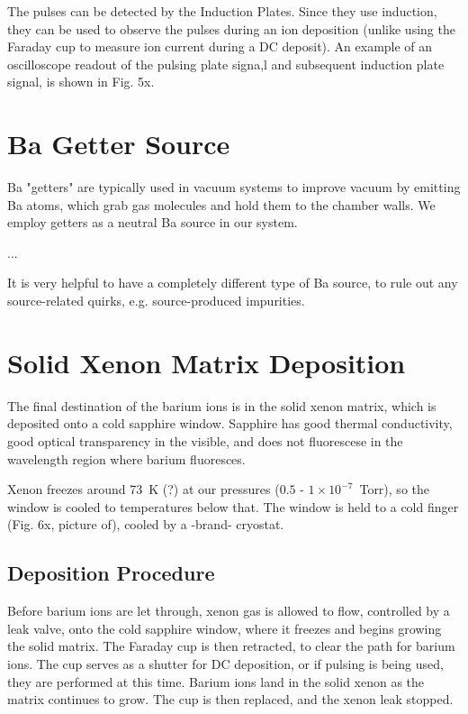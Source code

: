 The pulses can be detected by the Induction Plates.  Since they use induction, they can be used to observe the pulses during an ion deposition (unlike using the Faraday cup to measure ion current during a DC deposit).  An example of an oscilloscope readout of the pulsing plate signa,l and subsequent induction plate signal, is shown in Fig. 5x.

\section{Ba Getter Source}

Ba "getters" are typically used in vacuum systems to improve vacuum by emitting Ba atoms, which grab gas molecules and hold them to the chamber walls.  We employ getters as a neutral Ba source in our system.

...

It is very helpful to have a completely different type of Ba source, to rule out any source-related quirks, e.g. source-produced impurities.

\section{Solid Xenon Matrix Deposition}

The final destination of the barium ions is in the solid xenon matrix, which is deposited onto a cold sapphire window.  Sapphire has good thermal conductivity, good optical transparency in the visible, and does not fluorescese in the wavelength region where barium fluoresces.  

Xenon freezes around 73~K (?) at our pressures ($0.5$ - $1 \times 10^{-7}$~Torr), so the window is cooled to temperatures below that.  The window is held to a cold finger (Fig. 6x, picture of), cooled by a -brand- cryostat. %

\subsection{Deposition Procedure}

Before barium ions are let through, xenon gas is allowed to flow, controlled by a leak valve, onto the cold sapphire window, where it freezes and begins growing the solid matrix.  The Faraday cup is then retracted, to clear the path for barium ions.  The cup serves as a shutter for DC deposition, or if pulsing is being used, they are performed at this time.  Barium ions land in the solid xenon as the matrix continues to grow.  The cup is then replaced, and the xenon leak stopped.